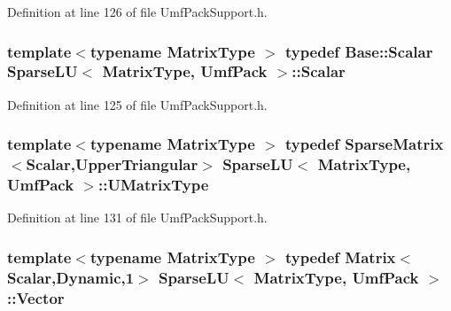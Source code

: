 Definition at line 126 of file Umf\-Pack\-Support.\-h.

\hypertarget{class_sparse_l_u_3_01_matrix_type_00_01_umf_pack_01_4_a69ffb45b1807211005457e8f787ccb45}{
\subsubsection[{Scalar}]{\setlength{\rightskip}{0pt plus 5cm}template$<$typename Matrix\-Type $>$ typedef {\bf Base\-::\-Scalar} {\bf Sparse\-L\-U}$<$ Matrix\-Type, {\bf Umf\-Pack} $>$\-::{\bf Scalar}\hspace{0.3cm}{\ttfamily [protected]}}}\label{class_sparse_l_u_3_01_matrix_type_00_01_umf_pack_01_4_a69ffb45b1807211005457e8f787ccb45}


Definition at line 125 of file Umf\-Pack\-Support.\-h.

\hypertarget{class_sparse_l_u_3_01_matrix_type_00_01_umf_pack_01_4_a22232647515b18b74cd7c1dadc5d85df}{
\subsubsection[{U\-Matrix\-Type}]{\setlength{\rightskip}{0pt plus 5cm}template$<$typename Matrix\-Type $>$ typedef {\bf Sparse\-Matrix}$<${\bf Scalar},{\bf Upper\-Triangular}$>$ {\bf Sparse\-L\-U}$<$ Matrix\-Type, {\bf Umf\-Pack} $>$\-::{\bf U\-Matrix\-Type}\hspace{0.3cm}{\ttfamily [protected]}}}\label{class_sparse_l_u_3_01_matrix_type_00_01_umf_pack_01_4_a22232647515b18b74cd7c1dadc5d85df}


Definition at line 131 of file Umf\-Pack\-Support.\-h.

\hypertarget{class_sparse_l_u_3_01_matrix_type_00_01_umf_pack_01_4_adbf917e2dc33be7373d5f3e829d56730}{
\subsubsection[{Vector}]{\setlength{\rightskip}{0pt plus 5cm}template$<$typename Matrix\-Type $>$ typedef {\bf Matrix}$<${\bf Scalar},{\bf Dynamic},1$>$ {\bf Sparse\-L\-U}$<$ Matrix\-Type, {\bf Umf\-Pack} $>$\-::{\bf Vector}\hspace{0.3cm}{\ttfamily [protected]}}}\label{class_sparse_l_u_3_01_matrix_type_00_01_umf_pack_01_4_adbf917e2dc33be7373d5f3e829d56730}


